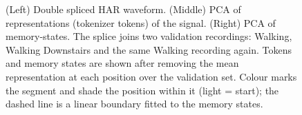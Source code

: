 \providecommand{\revtab}[1]{#1}
\providecommand{\rev}[1]{#1}
\begin{figure}[!ht]
\centering
\resizebox{\linewidth}{!}{%
%
}
\caption{\revtab{(Left) Double spliced HAR waveform. (Middle) PCA of representations (\rev{tokenizer} tokens) of the signal. (Right) PCA of memory-states. \rev{The splice joins two validation recordings: Walking, Walking Downstairs and the same Walking recording again. Tokens and memory states are shown after removing the mean representation at each position over the validation set. Colour marks the segment and shade the position within it (light = start); the dashed line is a linear boundary fitted to the memory states.}}}
\label{fig:pca-repr}
\end{figure}
